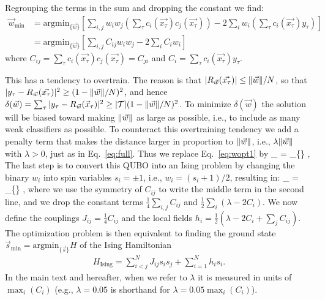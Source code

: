 Regrouping the terms in the sum and dropping the constant we find:
\begin{align}
\vec{w}_{\min}  & = \mathrm{argmin}_{\{\vec{w}\}}
 		\left[ \sum_{i,j} w_i w_j \left(\sum_\tau c_i(\vec{x_\tau})c_j(\vec{x_\tau})\right)  -2\sum_i w_i \left(\sum_\tau c_i(\vec{x_\tau})y_\tau\right) \right] \\
 		& =  \mathrm{argmin}_{\{\vec{w}\}} \left[ \sum_{i,j} C_{ij} w_i w_j - 2\sum_i C_i w_i \right]
		\label{eq:wopt1}
\end{align}
where $C_{ij} = \sum_\tau c_i(\vec{x_\tau})c_j(\vec{x_\tau}) = C_{ji}$ and $C_i = \sum_\tau c_i(\vec{x_\tau}) y_\tau$.


This has a tendency to overtrain. The reason is that $|R_{\vec{w}}(\vec{x_\tau})| \leq {\norm{\vec{w}}}/{N}$, so that $|y_\tau-R_{\vec{w}}(\vec{x_\tau})|^2 \geq (1-\norm{\vec{w}}/{N})^2$, and hence $\delta(\vec{w}) = \sum_\tau |y_\tau-R_{\vec{w}}(\vec{x}_\tau)|^2 \geq |\mathcal{T}| (1-{\norm{\vec{w}}}/{N})^2$. To minimize $\delta(\vec{w})$ the solution will be biased toward making $\norm{\vec{w}}$ as large as possible, i.e., to include as many weak classifiers as possible. To counteract this overtraining tendency we add a penalty term that makes the distance larger in proportion to $\norm{\vec{w}}$, i.e., $\lambda\norm{\vec{w}}$ with $\lambda>0$, just as in Eq.~\eqref{eq:full}. Thus we replace Eq.~\eqref{eq:wopt1} by
\beq
{}_{\min}  = _{\{\}}  ,
\label{eq:wopt2}
\eeq
The last step is to convert this QUBO into an Ising problem by changing the binary $w_i$ into spin variables $s_i=\pm 1$, i.e., $w_i= (s_i+1)/2$, resulting in:
\beq
{}_{\min}  = _{\{\}}  ,
\eeq
where we use the symmetry of $C_{ij}$ to write the middle term in the second line, and we drop the constant terms $\frac{1}{4}\sum_{i,j} C_{ij}$ and $\frac{1}{2}\sum_i (\lambda-2C_i)$.
We now define the couplings $J_{ij} = \frac{1}{4} C_{ij}$ and the local fields $h_i=\frac{1}{2}\left(\lambda-2C_i+\sum_{j}C_{ij} \right)$. The optimization problem is then equivalent to finding the ground state
$\vec{s}_{\min} = \mathrm{argmin}_{\{\vec{s}\}} H$ of the Ising Hamiltonian
 \begin{align}
 		H_{\mathrm{Ising}} =  \sum_{i<j}^{N} J_{ij} s_i s_j + \sum_{i=1}^{N} h_i s_i .
		\label{eq:HIsing}
 \end{align}
In the main text and hereafter, when we refer to $\lambda$ it is measured in units of $\max_i(C_i)$ (e.g., $\lambda=0.05$ is shorthand for $\lambda=0.05\max_i(C_i)$).


